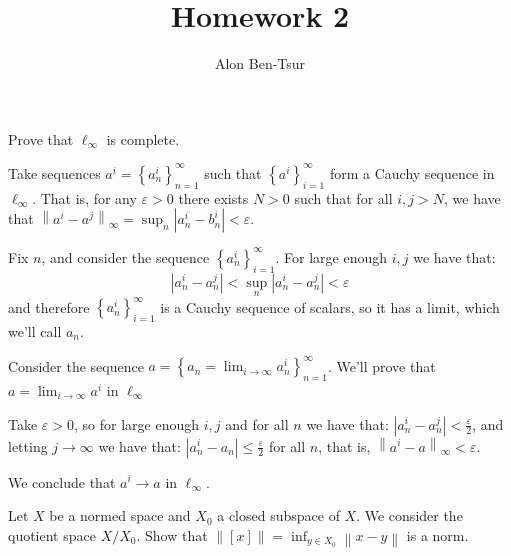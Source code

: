\documentclass[11pt]{article} %
\title{Homework 2}
\author{Alon Ben-Tsur}
\newcommand{\norm}[1]{\left\lVert#1\right\rVert}
\begin{document}
\maketitle

\begin{Exercise}
Prove that $\ell_\infty$ is complete.
\end{Exercise}

\begin{Answer}
Take sequences $a^i = \left\{a^i_n\right\}_{n=1}^\infty$ such that $\left\{a^i\right\}_{i = 1}^\infty$ form a Cauchy sequence in $\ell_\infty$. That is, for any $\varepsilon > 0$ there exists $N >0$ such that for all $i,j > N$, we have that $\norm{ a^i - a^j } _\infty = \sup_n\left|a^i_n - b^i_n\right| < \varepsilon$.

Fix $n$, and consider the sequence $\left\{ a^i_n \right\}_{i=1}^\infty$. For large enough $i, j$ we have that:
\[ \left| a^i_n - a^j_n  \right| < \sup_n \left| a^i _n- a^j_n\right| < \varepsilon \]
and therefore $\left\{ a^i_n \right\}_{i=1}^\infty$ is a Cauchy sequence of scalars, so it has a limit, which we'll call $a_n$.

Consider the sequence $a = \left\{a_n = \lim_{i\to\infty}a^i_n\right\}_{n = 1}^\infty$. We'll prove that $a = \lim_{i\to\infty}a^i$ in $\ell_\infty$

Take $\varepsilon > 0$, so for large enough $i, j$ and for all $n$ we have that: $ \left|a^i_n - a^j_n\right| < \frac{\varepsilon}{2}$, and letting $j \to \infty$ we have that: $\left|a^i_n - a_n \right| \leq \frac{\varepsilon}{2}$ for all $n$, that is, $\norm{ a^i - a } _\infty < \varepsilon$.

We conclude that $a^i \to a$ in $\ell_\infty$.
\end{Answer}

\begin{Exercise}
Let $X$ be a normed space and $X_0$ a closed subspace of $X$. We consider the quotient space $X/X_0$. Show that $\norm{\left[x\right]} = \inf_{y\in X_0}\norm{x - y}$ is a norm.
\end{Exercise}
\end{document}
